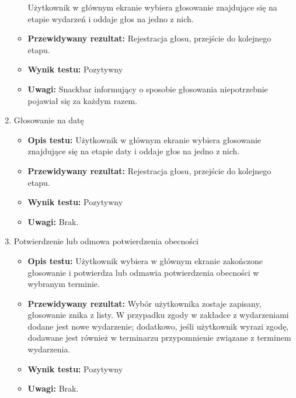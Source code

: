 \documentclass[10pt,a4paper]{article}
\begin{document}
\begin{enumerate}
\begin{itemize}
				Użytkownik w głównym ekranie wybiera głosowanie znajdujące się na
				etapie wydarzeń i oddaje głos na jedno z nich.
			\item \textbf{Przewidywany rezultat:} 
				Rejestracja głosu, przejście do kolejnego etapu.
			\item \textbf{Wynik testu:} Pozytywny
			\item \textbf{Uwagi:}
				Snackbar informujący o sposobie głosowania niepotrzebnie pojawiał się
				za każdym razem.
		\end{itemize}
	\item Głosowanie na datę
		\begin{itemize}
			\item \textbf{Opis testu:}
				Użytkownik w głównym ekranie wybiera głosowanie znajdujące się na
				etapie daty i oddaje głos na jedno z nich.
			\item \textbf{Przewidywany rezultat:} 
				Rejestracja głosu, przejście do kolejnego etapu.
			\item \textbf{Wynik testu:} Pozytywny
			\item \textbf{Uwagi:} Brak.
		\end{itemize}
	\item Potwierdzenie lub odmowa potwierdzenia obecności
		\begin{itemize}
			\item \textbf{Opis testu:}
				Użytkownik wybiera w głównym ekranie zakończone głosowanie i potwierdza
				lub odmawia potwierdzenia obecności w wybranym terminie.
			\item \textbf{Przewidywany rezultat:} 
				Wybór użytkownika zostaje zapisany, głosowanie znika z listy. W przypadku
				zgody w zakładce z wydarzeniami dodane jest nowe wydarzenie; dodatkowo,
				jeśli użytkownik wyrazi zgodę, dodawane jest również w terminarzu
				przypomnienie związane z terminem wydarzenia.
			\item \textbf{Wynik testu:} Pozytywny
			\item \textbf{Uwagi:} Brak.
		\end{itemize}
\end{enumerate}
\end{document}
